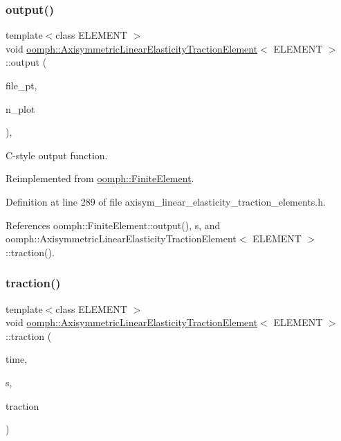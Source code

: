 \subsubsection{\texorpdfstring{output()}{output()}\hspace{0.1cm}{\footnotesize\ttfamily [4/4]}}
{\footnotesize\ttfamily template$<$class E\+L\+E\+M\+E\+NT $>$ \\
void \hyperlink{classoomph_1_1AxisymmetricLinearElasticityTractionElement}{oomph\+::\+Axisymmetric\+Linear\+Elasticity\+Traction\+Element}$<$ E\+L\+E\+M\+E\+NT $>$\+::output (\begin{DoxyParamCaption}\item[{F\+I\+LE $\ast$}]{file\+\_\+pt,  }\item[{const unsigned \&}]{n\+\_\+plot }\end{DoxyParamCaption})\hspace{0.3cm}{\ttfamily [inline]}, {\ttfamily [virtual]}}



C-\/style output function. 



Reimplemented from \hyperlink{classoomph_1_1FiniteElement_adfaee690bb0608f03320eeb9d110d48c}{oomph\+::\+Finite\+Element}.



Definition at line 289 of file axisym\+\_\+linear\+\_\+elasticity\+\_\+traction\+\_\+elements.\+h.



References oomph\+::\+Finite\+Element\+::output(), s, and oomph\+::\+Axisymmetric\+Linear\+Elasticity\+Traction\+Element$<$ E\+L\+E\+M\+E\+N\+T $>$\+::traction().

\mbox{\label{classoomph_1_1AxisymmetricLinearElasticityTractionElement_a28af87bac3d8d0c935564e69277e215e}} 
\subsubsection{\texorpdfstring{traction()}{traction()}}
{\footnotesize\ttfamily template$<$class E\+L\+E\+M\+E\+NT $>$ \\
void \hyperlink{classoomph_1_1AxisymmetricLinearElasticityTractionElement}{oomph\+::\+Axisymmetric\+Linear\+Elasticity\+Traction\+Element}$<$ E\+L\+E\+M\+E\+NT $>$\+::traction (\begin{DoxyParamCaption}\item[{const double \&}]{time,  }\item[{const \hyperlink{classoomph_1_1Vector}{Vector}$<$ double $>$ \&}]{s,  }\item[{\hyperlink{classoomph_1_1Vector}{Vector}$<$ double $>$ \&}]{traction }\end{DoxyParamCaption})}



